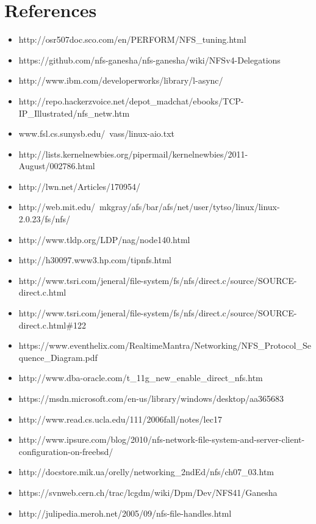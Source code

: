 \section{References}
\begin{itemize}
\item http://osr507doc.sco.com/en/PERFORM/NFS\_tuning.html
\item https://github.com/nfs-ganesha/nfs-ganesha/wiki/NFSv4-Delegations
\item http://www.ibm.com/developerworks/library/l-async/
\item http://repo.hackerzvoice.net/depot\_madchat/ebooks/TCP-IP\_Illustrated/nfs\_netw.htm
\item www.fsl.cs.sunysb.edu/~vass/linux-aio.txt
\item http://lists.kernelnewbies.org/pipermail/kernelnewbies/2011-August/002786.html
\item http://lwn.net/Articles/170954/
\item http://web.mit.edu/~mkgray/afs/bar/afs/net/user/tytso/linux/linux-2.0.23/fs/nfs/
\item http://www.tldp.org/LDP/nag/node140.html
\item http://h30097.www3.hp.com/tipnfs.html
\item http://www.tsri.com/jeneral/file-system/fs/nfs/direct.c/source/SOURCE-direct.c.html
\item http://www.tsri.com/jeneral/file-system/fs/nfs/direct.c/source/SOURCE-direct.c.html\#122
\item https://www.eventhelix.com/RealtimeMantra/Networking/NFS\_Protocol\_Sequence\_Diagram.pdf
\item http://www.dba-oracle.com/t\_11g\_new\_enable\_direct\_nfs.htm
\item https://msdn.microsoft.com/en-us/library/windows/desktop/aa365683%
\item http://www.read.cs.ucla.edu/111/2006fall/notes/lec17
\item http://www.ipsure.com/blog/2010/nfs-network-file-system-and-server-client-configuration-on-freebsd/
\item http://docstore.mik.ua/orelly/networking\_2ndEd/nfs/ch07\_03.htm
\item https://svnweb.cern.ch/trac/lcgdm/wiki/Dpm/Dev/NFS41/Ganesha
\item http://julipedia.meroh.net/2005/09/nfs-file-handles.html
\end{itemize}
